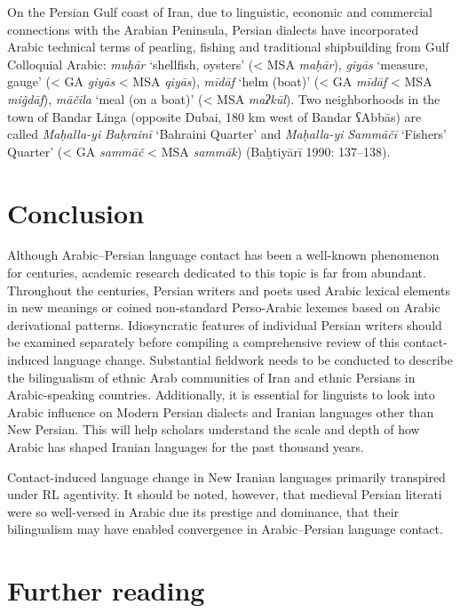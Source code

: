 \documentclass[output=paper]{langsci/langscibook}
\begin{document}
On the Persian Gulf coast of Iran, due to linguistic, economic and commercial connections with the Arabian Peninsula, Persian dialects have incorporated Arabic technical terms of pearling, fishing and traditional shipbuilding from Gulf Colloquial Arabic: \textit{muḥār} ‘shellfish, oysters’ (< MSA \textit{maḥār}), \textit{giyās} ‘measure, gauge’ (< GA \textit{giyās} < MSA \textit{qiyās}), \textit{mīdāf} ‘helm (boat)’ (< GA \textit{mīdāf} < MSA \textit{miǧdāf}), \textit{māčila} ‘meal (on a boat)’ (< MSA \textit{maʔkūl}). Two neighborhoods in the town of Bandar Linga (opposite Dubai, 180 km west of Bandar ʕAbbās) are called \textit{Maḥalla-yi} \textit{Baḥrainī} ‘Bahraini Quarter’ and \textit{Maḥalla-yi} \textit{Sammāčī} ‘Fishers’ Quarter’ (< GA \textit{sammāč} < MSA \textit{sammāk}) (Baḫtiyārī 1990: 137–138).

\section{Conclusion}

Although Arabic–Persian language contact has been a well-known phenomenon for centuries, academic research dedicated to this topic is far from abundant. Throughout the centuries, Persian writers and poets used Arabic lexical elements in new meanings or coined non-standard Perso-Arabic lexemes based on Arabic derivational patterns. Idiosyncratic features of individual Persian writers should be examined separately before compiling a comprehensive review of this contact-induced language change. Substantial fieldwork needs to be conducted to describe the bilingualism of ethnic Arab communities of Iran and ethnic Persians in Arabic-speaking countries. Additionally, it is essential for linguists to look into Arabic influence on Modern Persian dialects and Iranian languages other than New Persian. This will help scholars understand the scale and depth of how Arabic has shaped Iranian languages for the past thousand years.

Contact-induced language change in New Iranian languages primarily transpired under RL agentivity. It should be noted, however, that medieval Persian literati were so well-versed in Arabic due its prestige and dominance, that their bilingualism may have enabled convergence in Arabic–Persian language contact.

\section*{Further reading}
\end{document}

